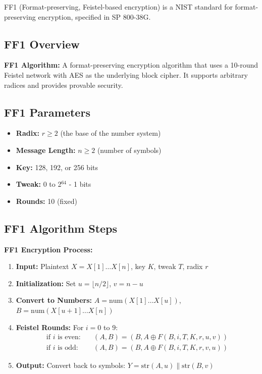 \documentclass[11pt,a4paper]{article}
\begin{document}
FF1 (Format-preserving, Feistel-based encryption) is a NIST standard for format-preserving encryption, specified in SP 800-38G.

\subsection{FF1 Overview}

\begin{definitionbox}
\textbf{FF1 Algorithm:} A format-preserving encryption algorithm that uses a 10-round Feistel network with AES as the underlying block cipher. It supports arbitrary radices and provides provable security.
\end{definitionbox}

\subsection{FF1 Parameters}

\begin{itemize}
    \item \textbf{Radix:} $r \geq 2$ (the base of the number system)
    \item \textbf{Message Length:} $n \geq 2$ (number of symbols)
    \item \textbf{Key:} 128, 192, or 256 bits
    \item \textbf{Tweak:} 0 to 2$^{64}$ - 1 bits
    \item \textbf{Rounds:} 10 (fixed)
\end{itemize}

\subsection{FF1 Algorithm Steps}

\begin{mathbox}
\textbf{FF1 Encryption Process:}
\begin{enumerate}
    \item \textbf{Input:} Plaintext $X = X[1] \ldots X[n]$, key $K$, tweak $T$, radix $r$
    \item \textbf{Initialization:} Set $u = \lfloor n/2 \rfloor$, $v = n - u$
    \item \textbf{Convert to Numbers:} $A = \text{num}(X[1] \ldots X[u])$, $B = \text{num}(X[u+1] \ldots X[n])$
    \item \textbf{Feistel Rounds:} For $i = 0$ to $9$:
    \begin{align*}
        \text{if } i \text{ is even:} &\quad (A, B) = (B, A \oplus F(B, i, T, K, r, u, v)) \\
        \text{if } i \text{ is odd:} &\quad (A, B) = (B, A \oplus F(B, i, T, K, r, v, u))
    \end{align*}
    \item \textbf{Output:} Convert back to symbols: $Y = \text{str}(A, u) \parallel \text{str}(B, v)$
\end{enumerate}
\end{mathbox}
\end{document}
